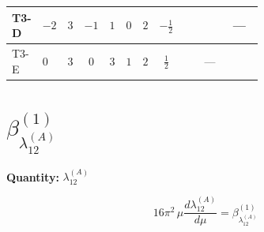 \documentclass[8pt]{article}
\begin{document}
\begin{landscape}
\begin{longtable}{@{}llcccccc >{\raggedright\arraybackslash}p{0.21\linewidth} >{\raggedright\arraybackslash}p{0.21\linewidth} >{\raggedright\arraybackslash}p{0.21\linewidth}@{}}
T3-D & $-2$ & $3$ & $-1$ & $1$ & $0$ & $2$ & $-\frac{1}{2}$ & \scriptsize\adjustbox{max width=\linewidth}{$\begin{gathered} -\frac{9 {g_1}^2 {\lambda_5}}{2}\end{gathered}$} & \scriptsize\adjustbox{max width=\linewidth}{$\begin{gathered} {\lambda_5} (6 \operatorname{Tr}\!\left({Y_d}\,\left({Y_d}\right)^{\dagger}\right)+2 \operatorname{Tr}\!\left({Y_e}\,\left({Y_e}\right)^{\dagger}\right)+6 \operatorname{Tr}\!\left({Y_u}\,\left({Y_u}\right)^{\dagger}\right)-4 {\lambda_{HS_1}^{(A)}})\end{gathered}$} & --- \\
\midrule
T3-E & $0$ & $3$ & $0$ & $3$ & $1$ & $2$ & $\frac{1}{2}$ & \scriptsize\adjustbox{max width=\linewidth}{$\begin{gathered} -\frac{9 {g_1}^2 {\lambda_5}}{2}\end{gathered}$} & --- & \scriptsize\adjustbox{max width=\linewidth}{$\begin{gathered} {\lambda_5} \left(6 \operatorname{Tr}\!\left({Y_d}\,\left({Y_d}\right)^{\dagger}\right)+2 \operatorname{Tr}\!\left({Y_e}\,\left({Y_e}\right)^{\dagger}\right)+6 \operatorname{Tr}\!\left({Y_u}\,\left({Y_u}\right)^{\dagger}\right)-\frac{4 {\lambda_{12}^{(A)}}}{3}-2 {\lambda_{12}^{(\times)}}-2 {\lambda_{HS_1}^{(A)}}-\frac{4 {\lambda_{HS_2}^{(A)}}}{3}\right)\end{gathered}$} \\
\midrule
\bottomrule
\end{longtable}
\clearpage
\section*{$\beta_{\lambda_{12}^{(A)}}^{(1)}$}
\noindent\textbf{Quantity: }$\lambda_{12}^{(A)}$\par\smallskip
\[16\pi^2\,\mu\frac{d \lambda_{12}^{(A)}}{d\mu}=\beta_{\lambda_{12}^{(A)}}^{(1)}\]

\end{landscape}
\end{document}
